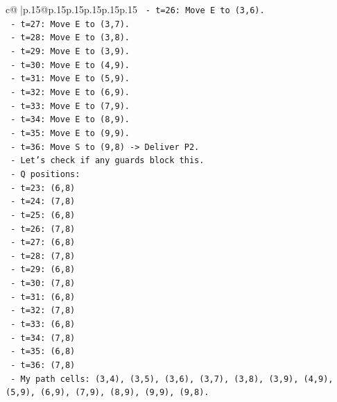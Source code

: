 \documentclass{article}
\begin{document}
{\begin{supertabular}{c@{$\;$}|p{.15\linewidth}@{}p{.15\linewidth}p{.15\linewidth}p{.15\linewidth}p{.15\linewidth}p{.15\linewidth}}
{{{\texttt{                {-}   t=26: Move E to (3,6).} \\
\texttt{                {-}   t=27: Move E to (3,7).} \\
\texttt{                {-}   t=28: Move E to (3,8).} \\
\texttt{                {-}   t=29: Move E to (3,9).} \\
\texttt{                {-}   t=30: Move E to (4,9).} \\
\texttt{                {-}   t=31: Move E to (5,9).} \\
\texttt{                {-}   t=32: Move E to (6,9).} \\
\texttt{                {-}   t=33: Move E to (7,9).} \\
\texttt{                {-}   t=34: Move E to (8,9).} \\
\texttt{                {-}   t=35: Move E to (9,9).} \\
\texttt{                {-}   t=36: Move S to (9,8) {-}> Deliver P2.} \\
\texttt{            {-}   Let's check if any guards block this.} \\
\texttt{            {-}   Q positions:} \\
\texttt{                {-}   t=23: (6,8)} \\
\texttt{                {-}   t=24: (7,8)} \\
\texttt{                {-}   t=25: (6,8)} \\
\texttt{                {-}   t=26: (7,8)} \\
\texttt{                {-}   t=27: (6,8)} \\
\texttt{                {-}   t=28: (7,8)} \\
\texttt{                {-}   t=29: (6,8)} \\
\texttt{                {-}   t=30: (7,8)} \\
\texttt{                {-}   t=31: (6,8)} \\
\texttt{                {-}   t=32: (7,8)} \\
\texttt{                {-}   t=33: (6,8)} \\
\texttt{                {-}   t=34: (7,8)} \\
\texttt{                {-}   t=35: (6,8)} \\
\texttt{                {-}   t=36: (7,8)} \\
\texttt{            {-}   My path cells: (3,4), (3,5), (3,6), (3,7), (3,8), (3,9), (4,9), (5,9), (6,9), (7,9), (8,9), (9,9), (9,8).} \\
}}}
\end{supertabular}}
\end{document}
